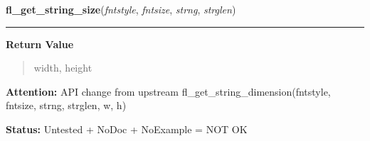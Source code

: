     \label{xformslib:library:fl_get_string_dimension}

    \vspace{0.5ex}

\hspace{.8\funcindent}\begin{boxedminipage}{\funcwidth}

    \raggedright \textbf{fl\_get\_string\_size}(\textit{fntstyle}, \textit{fntsize}, \textit{strng}, \textit{strglen})

    \vspace{-1.5ex}

    \rule{\textwidth}{0.5\fboxrule}
\setlength{\parskip}{2ex}
\setlength{\parskip}{1ex}
      \textbf{Return Value}
    \vspace{-1ex}

      \begin{quote}
      width, height

      \end{quote}

\textbf{Attention:} API change from upstream fl\_get\_string\_dimension(fntstyle, fntsize, 
strng, strglen, w, h)



\textbf{Status:} Untested + NoDoc + NoExample = NOT OK



    \end{boxedminipage}

    \label{xformslib:library:fl_get_align_xy}

    \vspace{0.5ex}

